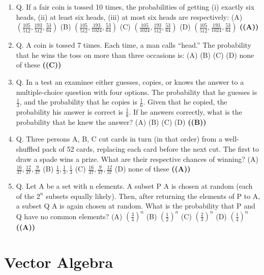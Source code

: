 \documentclass{article}
\begin{document}
\begin{enumerate}
\item Q. If a fair coin is tossed 10 times, the probabilities of getting (i) exactly six heads, (ii) at
least six heads, (iii) at most six heads are respectively:
(A) $\left(\frac{105}{512}, \frac{193}{512}, \frac{53}{64}\right)$
(B) $\left(\frac{105}{512}, \frac{193}{1024}, \frac{53}{64}\right)$
(C) $\left(\frac{105}{1024}, \frac{193}{512}, \frac{53}{64}\right)$
(D) $\left(\frac{105}{512}, \frac{193}{1024}, \frac{53}{64}\right)$ \hfill \textbf{((A))}
\item Q. A coin is tossed 7 times. Each time, a man calls “head.” The probability that he wins
the toss on more than three occasions is:
(A) 
(B) 
(C) 
(D) none of these \hfill \textbf{((C))}
\item Q. In a test an examinee either guesses, copies, or knows the answer to a multiple-choice
question with four options. The probability that he guesses is $\frac{1}{3}$, and the probability that
he copies is $\frac{1}{6}$. Given that he copied, the probability his answer is correct is $\frac{1}{8}$. If he answers
correctly, what is the probability that he knew the answer?
(A) 
(B) 
(C) 
(D)  \hfill \textbf{((B))}
\item Q. Three persons A, B, C cut cards in turn (in that order) from a well-shuffled pack of 52
cards, replacing each card before the next cut. The first to draw a spade wins a prize. What
are their respective chances of winning?
(A) $\frac{16}{37}, \frac{12}{37}, \frac{9}{37}$
(B) $\frac{1}{3}, \frac{1}{3}, \frac{1}{3}$
(C) $\frac{16}{37}, \frac{9}{37}, \frac{12}{37}$
(D) none of these \hfill \textbf{((A))}
\item Q. Let A be a set with n elements. A subset P \subseteq A is chosen at random (each of the $2^n$
subsets equally likely). Then, after returning the elements of P to A, a subset Q \subseteq A is
again chosen at random. What is the probability that P and Q have no common elements?
(A) $\left(\frac{3}{4}\right)^n$
(B) $\left(\frac{1}{2}\right)^n$
(C) $\left(\frac{2}{3}\right)^n$
(D) $\left(\frac{1}{4}\right)^n$ \hfill \textbf{((A))}
\end{enumerate}
\section{Vector Algebra}
\end{document}
